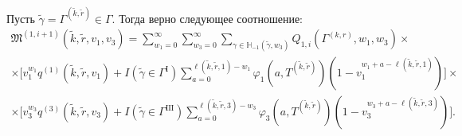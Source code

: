 \begin{lemma}
Пусть  $\tilde{\gamma}=\Gamma^{(\tilde{k}, \tilde{r})}\in \Gamma$. Тогда верно следующее соотношение:
\begin{multline*}
\mathfrak{M}^{(1, i+1)}(\tilde{k}, \tilde{r}, v_1, v_3) 
= \sum_{w_1=0}^{\infty}\sum_{w_3=0}^{\infty} \sum_{\gamma \in {\mathbb H}_{-1}(\tilde{\gamma}, w_3)} Q_{1, i}(\Gamma^{(k, r)}, w_1, w_3) \times \\ \times \bigl[ v_1^{w_1} q^{(1)}(\tilde{k}, \tilde{r}, v_1) + I(\tilde{\gamma}\in \Gamma^{\mathrm{I}}) \sum_{a=0}^{\ell(\tilde{k}, \tilde{r}, 1)-w_1} \varphi_1(a, T^{(\tilde{k}, \tilde{r})})(1-v_1^{w_1+a-\ell(\tilde{k}, \tilde{r}, 1)})\bigr] \times \\ 
\times \bigl[ v_3^{w_3} q^{(3)}(\tilde{k}, \tilde{r}, v_3) + I(\tilde{\gamma}\in \Gamma^{\mathrm{III}}) \sum_{a=0}^{\ell(\tilde{k}, \tilde{r}, 3)-w_3} \varphi_3(a, T^{(\tilde{k}, \tilde{r})})(1-v_3^{w_3+a-\ell(\tilde{k}, \tilde{r}, 3)})\bigr].
\end{multline*}
\label{second:approach:lemma:first:step}
\end{lemma}
